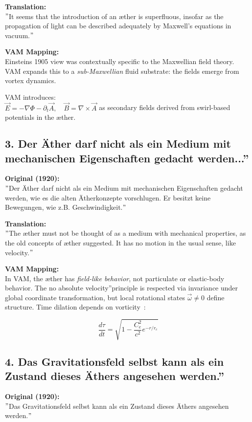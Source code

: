     \textbf{Translation:} \\
    \("\)It seems that the introduction of an æther is superfluous, insofar as the propagation of light can be described adequately by Maxwell's equations in vacuum.\("\)

    \textbf{VAM Mapping:} \\
    Einstein\rqs s 1905 view was contextually specific to the Maxwellian field theory. VAM expands this to a \emph{sub-Maxwellian} fluid substrate: the fields emerge from vortex dynamics.

    VAM introduces: \\
    \( \vec{E} = -\nabla \Phi - \partial_t \vec{A}, \quad \vec{B} = \nabla \times \vec{A} \) as secondary fields derived from swirl-based potentials in the æther.

    \subsection*{3. \grqq Der Äther darf nicht als ein Medium mit mechanischen Eigenschaften gedacht werden...\textquotedblright}
    \textbf{Original (1920):} \\
    \("\)Der Äther darf nicht als ein Medium mit mechanischen Eigenschaften gedacht werden, wie es die alten Ätherkonzepte vorschlugen. Er besitzt keine Bewegungen, wie z.B. Geschwindigkeit.\("\)

    \textbf{Translation:} \\
    \("\)The æther must not be thought of as a medium with mechanical properties, as the old concepts of æther suggested. It has no motion in the usual sense, like velocity.\("\)

    \textbf{VAM Mapping:} \\
    In VAM, the æther has \emph{field-like behavior}, not particulate or elastic-body behavior. The \grqq no absolute velocity\textquotedblright principle is respected via invariance under global coordinate transformation, but local rotational states \( \vec{\omega} \neq 0 \) define structure. Time dilation depends on vorticity~\cite{iskandarani2024vam2}:

    \[
    \frac{d\tau}{dt} = \sqrt{1 - \frac{C_e^2}{c^2} e^{-r/r_c}}
    \]

    \subsection*{4. \grqq Das Gravitationsfeld selbst kann als ein Zustand dieses Äthers angesehen werden.\textquotedblright}
    \textbf{Original (1920):} \\
    \("\)Das Gravitationsfeld selbst kann als ein Zustand dieses Äthers angesehen werden.\("\)

